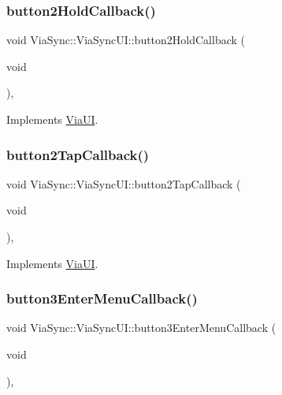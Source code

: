 \subsubsection{\texorpdfstring{button2\+Hold\+Callback()}{button2HoldCallback()}}
{\footnotesize\ttfamily void Via\+Sync\+::\+Via\+Sync\+U\+I\+::button2\+Hold\+Callback (\begin{DoxyParamCaption}\item[{void}]{ }\end{DoxyParamCaption})\hspace{0.3cm}{\ttfamily [override]}, {\ttfamily [virtual]}}



Implements \mbox{\hyperlink{class_via_u_i_a95bce2d662a8ae46be73497e868aebb9}{Via\+UI}}.

\mbox{\label{class_via_sync_1_1_via_sync_u_i_ac1a33313bc6c5c1f07b3a8cb3094a700}} 
\subsubsection{\texorpdfstring{button2\+Tap\+Callback()}{button2TapCallback()}}
{\footnotesize\ttfamily void Via\+Sync\+::\+Via\+Sync\+U\+I\+::button2\+Tap\+Callback (\begin{DoxyParamCaption}\item[{void}]{ }\end{DoxyParamCaption})\hspace{0.3cm}{\ttfamily [override]}, {\ttfamily [virtual]}}



Implements \mbox{\hyperlink{class_via_u_i_a8fce17e375ea6fe3a4746bff3e6dec75}{Via\+UI}}.

\mbox{\label{class_via_sync_1_1_via_sync_u_i_a695a9d89eaf1b1e03bba057e4f89b3c2}} 
\subsubsection{\texorpdfstring{button3\+Enter\+Menu\+Callback()}{button3EnterMenuCallback()}}
{\footnotesize\ttfamily void Via\+Sync\+::\+Via\+Sync\+U\+I\+::button3\+Enter\+Menu\+Callback (\begin{DoxyParamCaption}\item[{void}]{ }\end{DoxyParamCaption})\hspace{0.3cm}{\ttfamily [override]}, {\ttfamily [virtual]}}



